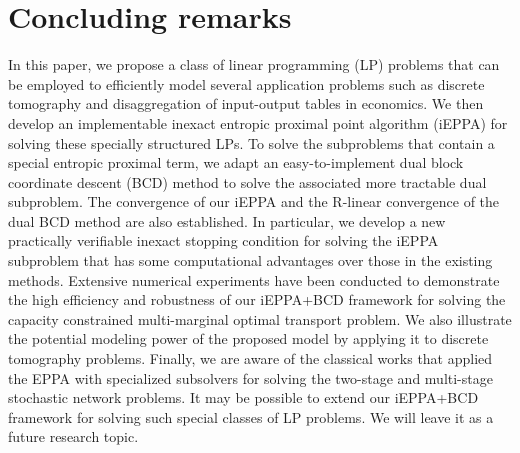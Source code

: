 \documentclass[10pt]{article}
\begin{document}










\section{Concluding remarks}\label{seccon}

In this paper, we propose a class of linear programming (LP) problems that can be employed to efficiently model several application problems such as discrete tomography and disaggregation of input-output tables in economics. We then develop an implementable inexact entropic proximal point algorithm (iEPPA) for solving these specially structured LPs. To solve the subproblems that contain a special entropic proximal term, we adapt an easy-to-implement dual block coordinate descent (BCD) method to solve the associated more tractable dual subproblem. The convergence of our iEPPA and the R-linear convergence of the dual BCD method are also established. In particular, we develop a new practically verifiable inexact stopping condition for solving the iEPPA subproblem that has some computational advantages over those in the existing methods. Extensive numerical experiments have been conducted to demonstrate the high efficiency and robustness of our iEPPA+BCD framework for solving the capacity constrained multi-marginal optimal transport problem.
We also illustrate the potential modeling power of the proposed model by applying it to discrete tomography problems. Finally, we are aware of the classical works \cite{nielsen1993massively, nielsen1996solving} that applied the EPPA with specialized subsolvers for solving the two-stage and multi-stage stochastic network problems. It may be possible to extend our iEPPA+BCD framework for solving such special classes of LP problems. We will leave it as a future research topic.
\end{document}
